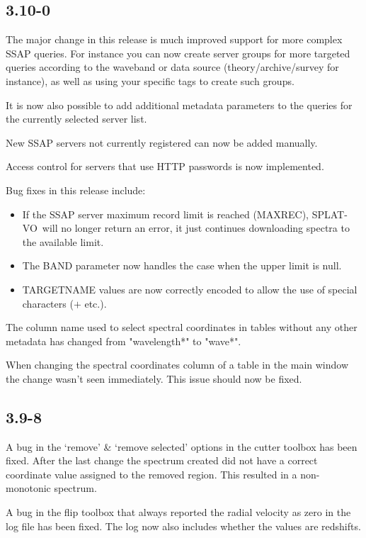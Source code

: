 \documentclass[twoside,11pt]{article}
\renewcommand{\_}{\texttt{\symbol{95}}}
\newcommand{\SPLAT}{\textsf{SPLAT-VO}}
\begin{document}
\subsection{3.10-0}

The major change in this release is much improved support for more complex
SSAP queries. For instance you can now create server groups for more targeted
queries according to the waveband or data source (theory/archive/survey for
instance), as well as using your specific tags to create such groups.

It is now also possible to add additional metadata parameters to the queries
for the currently selected server list.

New SSAP servers not currently registered can now be added  manually.

Access control for servers that use HTTP passwords is now implemented.

Bug fixes in this release include:
\begin{itemize}
\item If the SSAP server maximum record limit is reached (MAXREC),
\SPLAT\ will no longer return an error, it just continues downloading
spectra to the available limit.

\item The BAND parameter now handles the case when the upper limit is null.

\item TARGETNAME values are now correctly encoded to allow the use of special
characters ($+$ etc.).
\end{itemize}

The column name used to select spectral coordinates in tables without any
other metadata has changed from "wavelength*" to "wave*".
  
When changing the spectral coordinates column of a table in the main window
the change wasn't seen immediately. This issue should now be fixed.


\subsection{3.9-8}

A bug in the `remove' \& `remove selected' options in the cutter toolbox has
been fixed. After the last change the spectrum created did not have a correct
coordinate value assigned to the removed region. This resulted in a
non-monotonic spectrum.

A bug in the flip toolbox that always reported the radial velocity as zero in
the log file has been fixed. The log now also includes whether the values are
redshifts.
\end{document}
